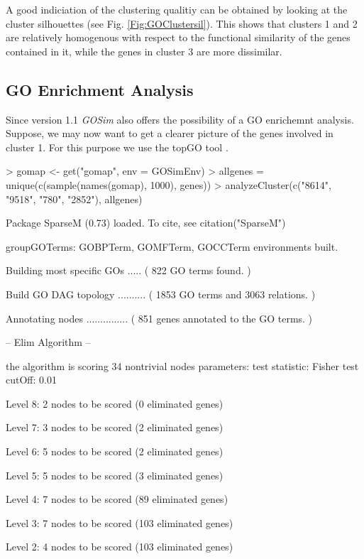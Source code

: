 \documentclass[12pt,a4paper]{article}
\begin{document}
A good indiciation of the clustering qualitiy can be obtained by looking at the cluster silhouettes \cite{rousseeuw87} (see Fig. \ref{Fig:GOClustersil}). This shows that clusters 1 and 2 are relatively homogenous with respect to the functional similarity of the genes contained in it, while the genes in cluster 3 are more dissimilar.

\subsection{GO Enrichment Analysis}

Since version 1.1 \emph{GOSim} also offers the possibility of a GO enrichemnt analysis. Suppose, we may now want to get a clearer picture of the genes involved in cluster 1. For this purpose we use the topGO tool \cite{Alexa2006topGO}.
\begin{Schunk}
\begin{Sinput}
> gomap <- get("gomap", env = GOSimEnv)
> allgenes = unique(c(sample(names(gomap), 1000), genes))
> analyzeCluster(c("8614", "9518", "780", "2852"), allgenes)
\end{Sinput}
\begin{Soutput}
Package SparseM (0.73) loaded.  To cite, see citation("SparseM")

groupGOTerms: 	GOBPTerm, GOMFTerm, GOCCTerm environments built.

Building most specific GOs .....	( 822 GO terms found. )

Build GO DAG topology ..........	( 1853 GO terms and 3063 relations. )

Annotating nodes ...............	( 851 genes annotated to the GO terms. )

			 -- Elim Algorithm -- 

		 the algorithm is scoring 34 nontrivial nodes
		 parameters: 
			 test statistic:  Fisher test 
			 cutOff:  0.01 

	 Level 8:	2 nodes to be scored	(0 eliminated genes)

	 Level 7:	3 nodes to be scored	(2 eliminated genes)

	 Level 6:	5 nodes to be scored	(2 eliminated genes)

	 Level 5:	5 nodes to be scored	(3 eliminated genes)

	 Level 4:	7 nodes to be scored	(89 eliminated genes)

	 Level 3:	7 nodes to be scored	(103 eliminated genes)

	 Level 2:	4 nodes to be scored	(103 eliminated genes)


\end{Soutput}
\end{Schunk}
\end{document}
